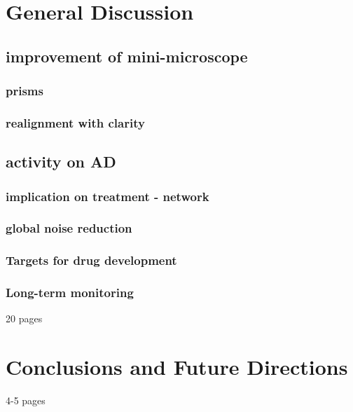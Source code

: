\chapter{General Discussion}
\section{improvement of mini-microscope}
\subsection{prisms}
\subsection{realignment with clarity}
\section{activity on AD}
\subsection{implication on treatment - network}
\subsection{global noise reduction}
\subsection{Targets for drug development}
\subsection{Long-term monitoring}
20 pages

\chapter{Conclusions and Future Directions}
4-5 pages
